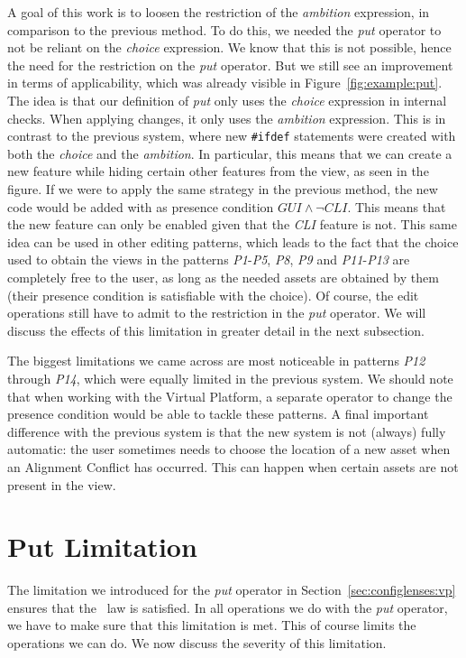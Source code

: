 A goal of this work is to loosen the restriction of the \emph{ambition} expression,
in comparison to the previous method. To do this, we needed the \emph{put} operator
to not be reliant on the \emph{choice} expression. We know that this is not possible,
hence the need for the restriction on the \emph{put} operator. But we still see an
improvement in terms of applicability, which was already visible in Figure~\ref{fig:example:put}.
The idea is that our definition of \emph{put} only uses the \emph{choice} expression
in internal checks. When applying changes, it only uses the \emph{ambition} expression.
This is in contrast to the previous system, where new \texttt{\#ifdef} statements were
created with both the \emph{choice} and the \emph{ambition}. In particular, this means
that we can create a new feature while hiding certain other features from the view,
as seen in the figure. If we were to apply the same strategy in the previous method, the
new code would be added with as presence condition \(\mathit{GUI} \land \neg\mathit{CLI}\).
This means that the new feature can only be enabled given that the \emph{CLI} feature is not.
This same idea can be used in other editing patterns, which leads to the fact that the 
choice used to obtain the views in the patterns \emph{P1}-\emph{P5}, \emph{P8}, \emph{P9}
and \emph{P11}-\emph{P13} are completely free to the user, as long as the needed assets
are obtained by them (their presence condition is satisfiable with the choice).
Of course, the edit operations still have to admit to the restriction in the 
\emph{put} operator. We will discuss the effects of this limitation in greater detail in 
the next subsection. 

The biggest limitations we came across are most noticeable in patterns
\emph{P12} through \emph{P14}, which were equally limited in the previous system.
We should note that when working with the Virtual Platform, a separate operator 
to change the presence condition would be able to tackle these patterns. A final
important difference with the previous system is that the new system is not (always)
fully automatic: the user sometimes needs to choose the location of a new asset 
when an Alignment Conflict has occurred. This can happen when certain assets are 
not present in the view.

\section{Put Limitation}
The limitation we introduced for the \emph{put} operator in
Section~\ref{sec:configlenses:vp} ensures that the \putget~law is satisfied.
In all operations we do with the \emph{put} operator, we have to make sure that
this limitation is met. This of course limits the operations we can do. We now
discuss the severity of this limitation.

